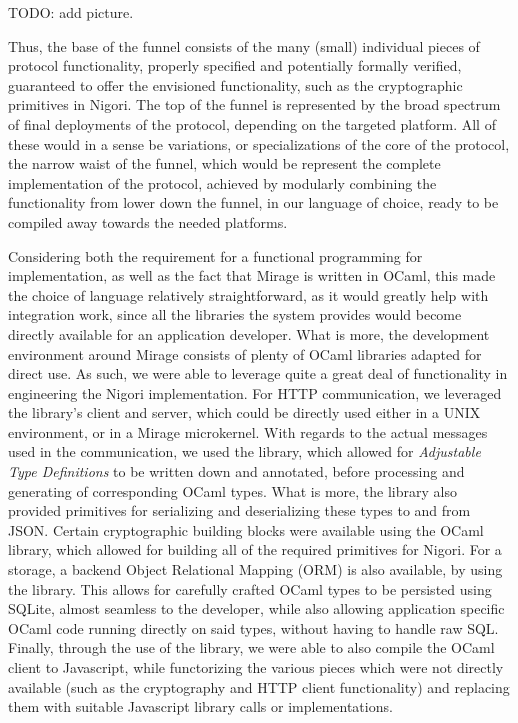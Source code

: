 TODO: add picture.

Thus, the base of the funnel consists of the many (small) individual pieces of protocol functionality, properly specified and potentially formally verified, guaranteed to offer the envisioned functionality, such as the cryptographic primitives in Nigori.
The top of the funnel is represented by the broad spectrum of final deployments of the protocol, depending on the targeted platform.
All of these would in a sense be variations, or specializations of the core of the protocol, the narrow waist of the funnel, which would be represent the complete implementation of the protocol, achieved by modularly combining the functionality from lower down the funnel, in our language of choice, ready to be compiled away towards the needed platforms.

Considering both the requirement for a functional programming for implementation, as well as the fact that Mirage is written in OCaml, this made the choice of language relatively straightforward, as it would greatly help with integration work, since all the libraries the system provides would become directly available for an application developer.
What is more, the development environment around Mirage consists of plenty of OCaml libraries adapted for direct use.
As such, we were able to leverage quite a great deal of functionality in engineering the Nigori implementation.
For HTTP communication, we leveraged the  library's client and server, which could be directly used either in a UNIX environment, or in a Mirage microkernel.
With regards to the actual messages used in the communication, we used the  library, which allowed for \textit{Adjustable Type Definitions} to be written down and annotated, before processing and generating of corresponding OCaml types.
What is more, the library also provided primitives for serializing and deserializing these types to and from JSON.
Certain cryptographic building blocks were available using the OCaml  library, which allowed for building all of the required primitives for Nigori.
For a storage, a backend Object Relational Mapping (ORM) is also available, by using the  library.
This allows for carefully crafted OCaml types to be persisted using SQLite, almost seamless to the developer, while also allowing application specific OCaml code running directly on said types, without having to handle raw SQL.
Finally, through the use of the  library, we were able to also compile the OCaml client to Javascript, while functorizing the various pieces which were not directly available (such as the cryptography and HTTP client functionality) and replacing them with suitable Javascript library calls or implementations.
